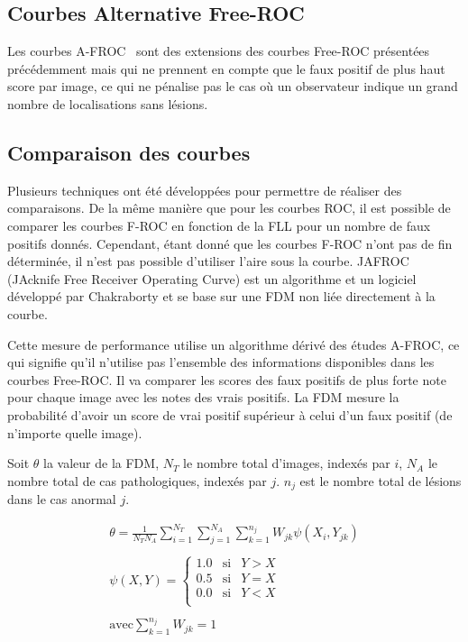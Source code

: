 \subsection{Courbes Alternative Free-ROC}

Les courbes A-FROC~\cite{chakraborty1990free} sont des extensions des courbes Free-ROC présentées précédemment mais qui ne prennent en compte que le faux positif de plus haut score par image, ce qui ne pénalise pas le cas où un observateur indique un grand nombre de localisations sans lésions.

\subsection{Comparaison des courbes}
\label{lab:AFROC}
Plusieurs techniques ont été développées pour permettre de réaliser des comparaisons. De la même manière que pour les courbes ROC, il est possible de comparer les courbes F-ROC en fonction de la FLL pour un nombre de faux positifs donnés. Cependant, étant donné que les courbes F-ROC n'ont pas de fin déterminée, il n'est pas possible d'utiliser l'aire sous la courbe. JAFROC\cite{chakraborty2004observer} (JAcknife Free Receiver Operating Curve) est un algorithme et un logiciel développé par Chakraborty et se base sur une FDM non liée directement à la courbe. 

Cette mesure de performance utilise un algorithme dérivé des études A-FROC, ce qui signifie qu'il n'utilise pas l'ensemble des informations disponibles dans les courbes Free-ROC. Il va comparer les scores des faux positifs de plus forte note pour chaque image avec les notes des vrais positifs. La FDM mesure la probabilité d'avoir un score de vrai positif supérieur à celui d'un faux positif (de n'importe quelle image).

Soit $\theta$ la valeur de la FDM, $N_T$ le nombre total d'images, indexés par $i$, $N_A$ le nombre total de cas pathologiques, indexés par $j$. $n_j$ est le nombre total de lésions dans le cas anormal $j$.

\begin{equation}
\label{eq:JAFROC1}
\begin{array}{l}
	\displaystyle \theta=\frac{1}{N_T N_A} \sum_{i=1}^{N_T} \sum_{j=1}^{N_A} \sum_{k=1}^{n_j} W_{jk} \psi(X_i, Y_{jk}) \\
	\\
	\displaystyle \psi(X,Y) = \left\{
		\begin{array}{lll}
			1.0 & \mbox{si} & Y > X \\
			0.5 & \mbox{si} & Y = X    \\
			0.0 & \mbox{si} & Y < X    \\
		\end{array}
	\right. \\
	\\
	\displaystyle \mbox{avec} \sum_{k=1}^{n_j} W_{jk} = 1 \\
\end{array}
\end{equation}

